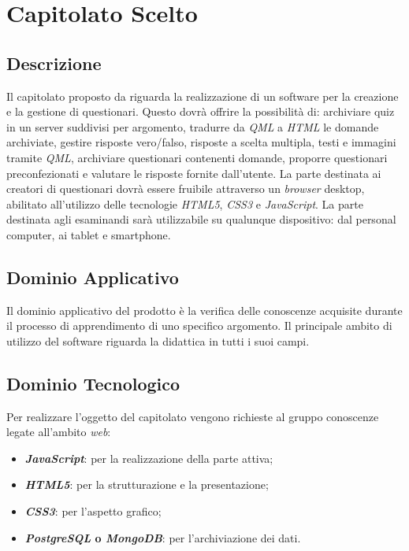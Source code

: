 \newpage
\section{Capitolato Scelto}
\subsection{Descrizione}
Il capitolato proposto da \proponente{} riguarda la realizzazione di un software per la creazione e la gestione di questionari. 
Questo dovrà offrire la possibilità di: archiviare quiz in un server suddivisi per argomento, tradurre da \textit{QML} a \textit{HTML} le domande archiviate, gestire risposte vero/falso, risposte a scelta multipla, testi e immagini tramite \textit{QML}, archiviare questionari contenenti domande, proporre questionari preconfezionati e valutare le risposte fornite dall'utente.
La parte destinata ai creatori di questionari dovrà essere fruibile attraverso un \textit{browser} desktop, abilitato all'utilizzo delle tecnologie \textit{HTML5}, \textit{CSS3} e \textit{JavaScript}.
La parte destinata agli esaminandi sarà utilizzabile su qualunque dispositivo: dal personal computer, ai tablet e smartphone.

\subsection{Dominio Applicativo}
Il dominio applicativo del prodotto è la verifica delle conoscenze acquisite durante il processo di apprendimento di uno specifico argomento.
Il principale ambito di utilizzo del software riguarda la didattica in tutti i suoi campi.

\subsection{Dominio Tecnologico}
Per realizzare l'oggetto del capitolato vengono richieste al gruppo conoscenze legate all'ambito \textit{web}:
\begin{itemize}
\item \textbf{\textit{JavaScript}}: per la realizzazione della parte attiva;
\item \textbf{\textit{HTML5}}: per la strutturazione e la presentazione; 
\item \textbf{\textit{CSS3}}: per l'aspetto grafico;
\item \textbf{\textit{PostgreSQL} o \textit{MongoDB}}: per l'archiviazione dei dati.
\end{itemize}

